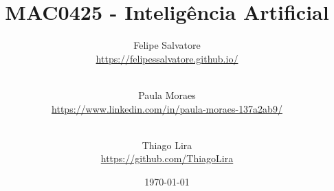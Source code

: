 \title{MAC0425 - Inteligência Artificial} %
\date{\today}

\author{
  Felipe Salvatore\\
  \url{https://felipessalvatore.github.io/}
  \vspace{0.1 cm}
  \and\\ 
  Paula Moraes\\
  \url{https://www.linkedin.com/in/paula-moraes-137a2ab9/}\vspace{0.1 cm}
  \and\\ 
  Thiago Lira\\
  \url{https://github.com/ThiagoLira}\\\vspace{0.1 cm}
}




